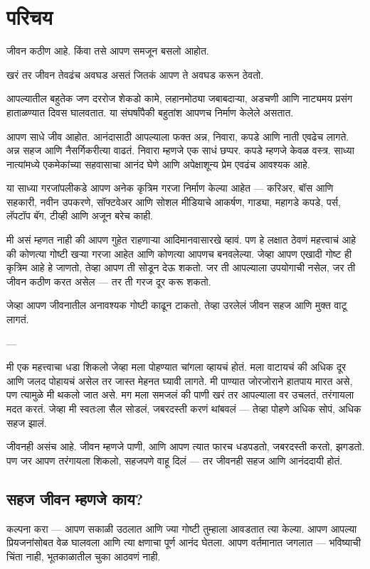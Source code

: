 \chapter{परिचय}

जीवन कठीण आहे. किंवा तसे आपण समजून बसलो आहोत.  

खरं तर जीवन तेवढंच अवघड असतं जितकं आपण ते अवघड करून ठेवतो.  

आपल्यातील बहुतेक जण दररोज शेकडो कामे, लहानमोठ्या जबाबदाऱ्या, अडचणी आणि नाट्यमय प्रसंग हाताळण्यात दिवस घालवतात.  
या संघर्षांपैकी बहुतांश आपणच निर्माण केलेले असतात.  

आपण साधे जीव आहोत.  
आनंदासाठी आपल्याला फक्त अन्न, निवारा, कपडे आणि नाती एवढेच लागते.  
अन्न सहज आणि नैसर्गिकरीत्या वाढतं.  
निवारा म्हणजे एक साधं छप्पर.  
कपडे म्हणजे केवळ वस्त्र.  
साध्या नात्यांमध्ये एकमेकांच्या सहवासाचा आनंद घेणे आणि अपेक्षाशून्य प्रेम एवढंच आवश्यक आहे.  

या साध्या गरजांपलीकडे आपण अनेक कृत्रिम गरजा निर्माण केल्या आहेत —  
करिअर, बॉस आणि सहकारी, नवीन उपकरणे, सॉफ्टवेअर आणि सोशल मीडियाचे आकर्षण, गाड्या, महागडे कपडे, पर्स, लॅपटॉप बॅग, टीव्ही आणि अजून बरेच काही.  

मी असं म्हणत नाही की आपण गुहेत राहणाऱ्या आदिमानवासारखे व्हावं.  
पण हे लक्षात ठेवणं महत्त्वाचं आहे की कोणत्या गोष्टी खऱ्या गरजा आहेत आणि कोणत्या आपणच बनवलेल्या.  
जेव्हा आपण एखादी गोष्ट ही कृत्रिम आहे हे जाणतो, तेव्हा आपण ती सोडून देऊ शकतो.  
जर ती आपल्याला उपयोगाची नसेल, जर ती जीवन कठीण करत असेल — तर ती गरज दूर करू शकतो.  

जेव्हा आपण जीवनातील अनावश्यक गोष्टी काढून टाकतो, तेव्हा उरलेलं जीवन सहज आणि मुक्त वाटू लागतं.  

---

मी एक महत्त्वाचा धडा शिकलो जेव्हा मला पोहण्यात चांगला व्हायचं होतं.  
मला वाटायचं की अधिक दूर आणि जलद पोहायचं असेल तर जास्त मेहनत घ्यावी लागते.  
मी पाण्यात जोरजोराने हातपाय मारत असे, पण त्यामुळे मी थकलो जात असे.  
मग मला समजलं की पाणी खरं तर आपल्याला वर उचलतं, तरंगायला मदत करतं.  
जेव्हा मी स्वतःला सैल सोडलं, जबरदस्ती करणं थांबवलं — तेव्हा पोहणे अधिक सोपं, अधिक सहज झालं.  

जीवनही असंच आहे.  
जीवन म्हणजे पाणी, आणि आपण त्यात फारच धडपडतो, जबरदस्ती करतो, झगडतो.  
पण जर आपण तरंगायला शिकलो, सहजपणे वाहू दिलं — तर जीवनही सहज आणि आनंददायी होतं.  

\section*{सहज जीवन म्हणजे काय?}

कल्पना करा —  
आपण सकाळी उठलात आणि ज्या गोष्टी तुम्हाला आवडतात त्या केल्या.  
आपण आपल्या प्रियजनांसोबत वेळ घालवला आणि त्या क्षणाचा पूर्ण आनंद घेतला.  
आपण वर्तमानात जगलात — भविष्याची चिंता नाही, भूतकाळातील चुका आठवणं नाही.  

